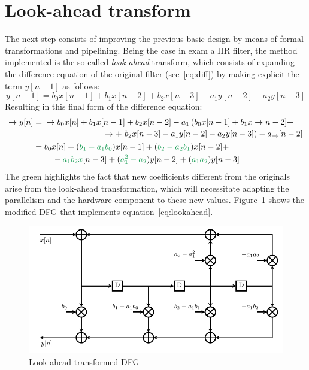 \documentclass[a4paper]{article}
\begin{document}
\section{Look-ahead transform}\label{sec:improv}
The next step consists of improving the previous basic design by means of formal transformations and pipelining. Being the case in exam a IIR filter, the method implemented is the so-called \emph{look-ahead} transform, which consists of expanding the difference equation of the original filter (see~\ref{eq:diff}) by making explicit the term $y[n-1]$ as follows:
\begin{equation*}
    y[n-1] = b_0x[n-1] + b_1x[n-2] + b_2x[n-3] - a_1y[n-2] - a_2y[n-3]
\end{equation*}
Resulting in this final form of the difference equation:
\begin{equation}\label{eq:lookahead}
\begin{split}
    \rightarrow y[n] &= \!\begin{multlined}[t]
    \rightarrow   b_0x[n] + b_1x[n-1] + b_2x[n-2] - a_1\left(b_0x[n-1]+ b_1x\rightarrow n-2]+\right. \\
        \left.\rightarrow +\ b_2x[n-3] - a_1y[n-2] - a_2y[n-3]\right) - a_\rightarrow  [n-2]
    \end{multlined} \\
    &= \!\begin{multlined}[t]
        b_0x[n] + (\textcolor{ForestGreen}{b_1-a_1b_0})x[n-1] + (\textcolor{ForestGreen}{b_2-a_2b_1})x[n-2] + \\
        -\textcolor{ForestGreen}{a_1b_2x}[n-3] + (\textcolor{ForestGreen}{a_1^2-a_2})y[n-2] + (\textcolor{ForestGreen}{a_1a_2})y[n-3]
    \end{multlined} \\   
\end{split}
\end{equation}
The green highlights the fact that new coefficients different from the originals arise from the look-ahead transformation, which will necessitate adapting the parallelism and the hardware component to these new values.
Figure~\ref{fig:lookahead_dfg} shows the modified DFG that implements equation~\ref{eq:lookahead}.

\begin{figure}[hbtp]
    \centering
    \includegraphics[width=.9\linewidth]{media/lookahead_dfg.pdf}
    \caption{Look-ahead transformed DFG}
    \label{fig:lookahead_dfg}
\end{figure}
\end{document}
